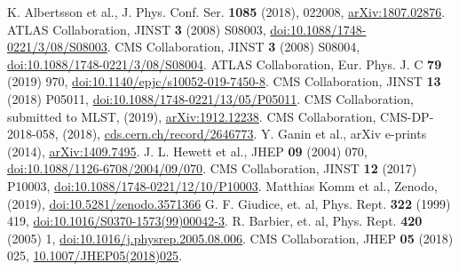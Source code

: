 \documentclass{webofc}
\begin{document}
\begin{thebibliography}{}
 K. Albertsson et al., J. Phys. Conf. Ser. \textbf{1085} (2018), 022008, \href{http://www.arxiv.org/abs/1807.02876}{arXiv:1807.02876}.
 ATLAS Collaboration, JINST \textbf{3} (2008) S08003, \href{http://dx.doi.org/10.1088/1748-0221/3/08/S08003}{doi:10.1088/1748-0221/3/08/S08003}.
  CMS Collaboration, JINST \textbf{3} (2008) S08004,
\href{http://dx.doi.org/10.1088/1748-0221/3/08/S08004}{doi:10.1088/1748-0221/3/08/S08004}.
 ATLAS Collaboration, Eur. Phys. J. C \textbf{79} (2019) 970, \href{http://dx.doi.org/10.1140/epjc/s10052-019-7450-8}{doi:10.1140/epjc/s10052-019-7450-8}.
 CMS Collaboration, JINST \textbf{13} (2018) P05011,
\href{http://dx.doi.org/10.1088/1748-0221/13/05/P05011}{doi:10.1088/1748-0221/13/05/P05011}.
 CMS Collaboration, submitted to MLST, (2019), \href{https://arxiv.org/abs/1912.12238}{arXiv:1912.12238}.
 CMS Collaboration, CMS-DP-2018-058, (2018), \href{https://cds.cern.ch/record/2646773}{cds.cern.ch/record/2646773}.
 Y. Ganin et al., arXiv e-prints (2014), \href{https://arxiv.org/abs/1409.7495}{arXiv:1409.7495}.
 J. L. Hewett et al., JHEP \textbf{09} (2004) 070, \href{http://dx.doi.org/10.1088/1126-6708/2004/09/070}{doi:10.1088/1126-6708/2004/09/070}.
 CMS Collaboration, JINST \textbf{12} (2017) P10003, \href{http://dx.doi.org/10.1088/1748-0221/12/10/P10003}{doi:10.1088/1748-0221/12/10/P10003}.
 Matthias Komm et al., Zenodo, (2019), \href{http://dx.doi.org/10.5281/zenodo.3571366}{doi:10.5281/zenodo.3571366}
 G. F. Giudice, et. al, Phys. Rept. \textbf{322} (1999) 419, \href{http://dx.doi.org/10.1016/S0370-1573(99)00042-3}{doi:10.1016/S0370-1573(99)00042-3}.
 R. Barbier, et. al, Phys. Rept. \textbf{420} (2005) 1, \href{http://dx.doi.org/10.1016/j.physrep.2005.08.006}{doi:10.1016/j.physrep.2005.08.006}.
 CMS Collaboration, JHEP \textbf{05} (2018) 025, \href{http://dx.doi.org/10.1007/JHEP05(2018)025}{10.1007/JHEP05(2018)025}.
\end{thebibliography}
\end{document}
